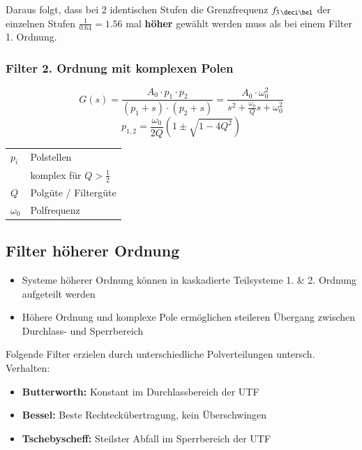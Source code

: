 Daraus folgt, dass bei 2 identischen Stufen die Grenzfrequenz $f_{3 \, \deci \bel}$ der einzelnen Stufen $\frac{1}{0.64} = 1.56$ mal 
\textbf{höher} gewählt werden muss als bei einem Filter 1. Ordnung.


\subsubsection{Filter 2. Ordnung mit komplexen Polen}

\begin{minipage}[c]{0.6\columnwidth}
    $$ G(s) = \frac{A_0 \cdot p_1 \cdot p_2}{(p_1 + s) \cdot (p_2 + s)} = \frac{A_0 \cdot \omega_0^2}{s^2 + \frac{\omega_0}{Q} s + \omega_0^2} $$
$$ p_{1,2} = \frac{\omega_0}{2 Q} (1 \pm \sqrt{1 - 4 Q^2}) $$
\end{minipage}
\hfill
\begin{minipage}[c]{0.38\columnwidth}
    \begin{tabular}{ll}
        $p_i$       & Polstellen \\
                    & komplex für $Q > \frac{1}{2}$ \\
        $Q$         & Polgüte / Filtergüte \\
        $\omega_0$  & Polfrequenz
    \end{tabular}
\end{minipage}


\subsection{Filter höherer Ordnung}

\begin{itemize}
    \item Systeme höherer Ordnung können in kaskadierte Teilsysteme 1. \& 2. Ordnung aufgeteilt werden
    \item Höhere Ordnung und komplexe Pole ermöglichen steileren Übergang zwischen Durchlass- und Sperrbereich
\end{itemize}

Folgende Filter erzielen durch unterschiedliche Polverteilungen untersch. Verhalten:

\begin{itemize}
    \item \textbf{Butterworth:} Konstant im Durchlassbereich der UTF
    \item \textbf{Bessel:} Beste Rechteckübertragung, kein Überschwingen
    \item \textbf{Tschebyscheff:} Steilster Abfall im Sperrbereich der UTF
\end{itemize}


